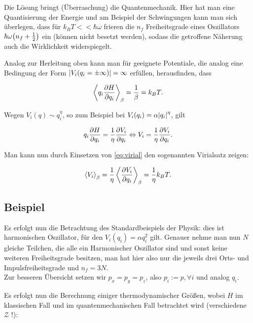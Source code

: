 Die Lösung bringt (Überraschung) die Quantenmechanik. Hier hat man eine Quantisierung der Energie und am Beispiel der Schwingungen kann man sich überlegen, dass für $k_B T << \hbar \omega$ frieren die $n_f$ Freiheitsgrade eines Oszillators $\hbar \omega \qty(n_f +\frac{1}{2})$ ein (können nicht besetzt werden), sodass die getroffene Näherung auch die Wirklichkeit widerspiegelt.


Analog zur Herleitung oben kann man für geeignete Potentiale, die analog eine Bedingung der Form $\abs{V_i(q_i = \pm\infty)} = \infty$ erfüllen, herausfinden, dass

\begin{equation}\label{eq:virial}
\expval{q_i \pdv{H}{q_i}}_\beta = \frac{1}{\beta} = k_B T .
\end{equation}

Wegen $V_i(q) \sim q_i^\eta$, so zum Beispiel bei $V_i(q_i) = \alpha \abs{q_i}^\eta$, gilt

\begin{equation}\label{key}
q_i \pdv{H}{q_i} = \frac{1}{\eta}\pdv{V_i}{q_i} \Leftrightarrow V_i = \frac{1}{\eta}\pdv{V_i}{q_i} .
\end{equation}

Man kann nun durch Einsetzen von \eqref{eq:virial} den sogenannten Virialsatz zeigen:

\begin{equation}\label{key}
\expval{V_i}_\beta = \frac{1}{\eta}\expval{\pdv{V_i}{q_i}}_\beta = \frac{1}{\eta} k_B T .
\end{equation}



	\subsection{Beispiel}
Es erfolgt nun die Betrachtung des Standardbeispiels der Physik: dies ist harmonischen Oszillator, für den $V_i(q_i) = \alpha q_i^2$ gilt. Genauer nehme man nun $N$ gleiche Teilchen, die alle ein Harmonischer Oszillator sind und sonst keine weiteren Freiheitsgrade besitzen, man hat hier also nur die jeweils drei Orts- und Impulsfreiheitsgrade und $n_f = 3N$.\medskip\\
Zur besseren Übersicht setzen wir $p_x = p_y = p_z$, also $p_i := p, \forall i$ und analog $q_i$.

Es erfolgt nun die Berechnung einiger thermodynamischer Größen, wobei $H$ im klassischen Fall und im quantenmechanischen Fall betrachtet wird (verschiedene $\mathcal{Z}$ !):

